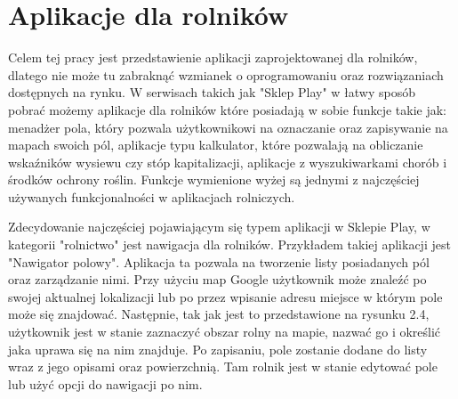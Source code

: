 \documentclass[a4paper,12pt,oneside]{book}
\begin{document}
	\section{Aplikacje dla rolników}
	Celem tej pracy jest przedstawienie aplikacji zaprojektowanej dla rolników, dlatego nie może tu zabraknąć wzmianek o oprogramowaniu oraz rozwiązaniach dostępnych na rynku. W serwisach takich jak "Sklep Play" w łatwy sposób pobrać możemy aplikacje dla rolników które posiadają w sobie funkcje takie jak: menadżer pola, który pozwala użytkownikowi na oznaczanie oraz zapisywanie na mapach swoich pól, aplikacje typu kalkulator, które pozwalają na obliczanie wskaźników wysiewu czy stóp kapitalizacji, aplikacje z wyszukiwarkami chorób i środków ochrony roślin. Funkcje wymienione wyżej są jednymi z najczęściej używanych funkcjonalności w aplikacjach rolniczych.
	
	Zdecydowanie najczęściej pojawiającym się typem aplikacji w Sklepie Play, w kategorii "rolnictwo" jest nawigacja dla rolników. Przykładem takiej aplikacji jest "Nawigator polowy". Aplikacja ta pozwala na tworzenie listy posiadanych pól oraz zarządzanie nimi. Przy użyciu map Google użytkownik może znaleźć po swojej aktualnej lokalizacji lub po przez wpisanie adresu miejsce w którym pole może się znajdować. Następnie, tak jak jest to przedstawione na rysunku 2.4, użytkownik jest w stanie zaznaczyć obszar rolny na mapie, nazwać go i określić jaka uprawa się na nim znajduje. Po zapisaniu, pole zostanie dodane do listy wraz z jego opisami oraz powierzchnią. Tam rolnik jest w stanie edytować pole lub użyć opcji do nawigacji po nim.
	
\end{document}
